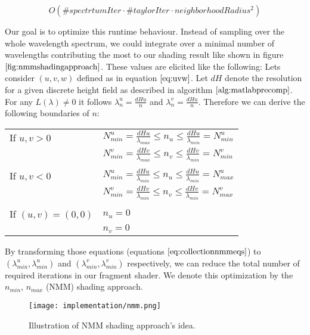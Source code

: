 \begin{equation}
O(\#spectrtumIter \cdot \#taylorIter \cdot neighborhoodRadius^2)
\end{equation}
 
Our goal is to optimize this runtime behaviour. Instead of sampling over the whole wavelength spectrum, we could integrate over a minimal number of  wavelengths contributing the most to our shading result like shown in figure $\ref{fig:nmmshadingapproach}$. These values are elicited like the following: Lets consider $(u,v,w)$ defined as in equation $\ref{eq:uvw}$. Let $dH$ denote the resolution for a given discrete height field as described in algorithm $\ref{alg:matlabprecomp}$. For any $L(\lambda) \neq 0$ it follows $\lambda_{n}^{u} = \frac{dH u}{n}$ and $\lambda_{n}^{v} = \frac{dH u}{n}$. Therefore we can derive the following boundaries of $n$:

\label{eq:collectionnmmeqs}
\begin{table}[H]
  \centering 
  \begin{tabular}{l l}
    If $u,v > 0$ & $N_{min}^{u} = \frac{dH u}{\lambda_{max}} \leq n_{u} \leq \frac{dH u}{\lambda_{min}} = N_{min}^{u}$ \\  
    & $N_{min}^{v} = \frac{dH v}{\lambda_{max}} \leq n_{v} \leq \frac{dH v}{\lambda_{min}} = N_{min}^{v}$ \\
    & \\
    If $u,v < 0$ & $N_{min}^{u} = \frac{dH u}{\lambda_{min}} \leq n_{u} \leq \frac{dH u}{\lambda_{min}} = N_{max}^{u}$ \\
    & $N_{min}^{v} = \frac{dH v}{\lambda_{min}} \leq n_{v} \leq \frac{dH v}{\lambda_{min}} = N_{max}^{v}$ \\
    & \\
    If $(u,v)=(0,0)$ & $n_u = 0$ \\
    & $n_v = 0$ \\  
  \end{tabular} 
\end{table}

By transforming those equations (equations $\ref{eq:collectionnmmeqs}$) to $(\lambda_{min}^{u}, \lambda_{min}^{u})$ and $(\lambda_{min}^{v}, \lambda_{min}^{v})$ respectively, we can reduce the total number of required iterations in our fragment shader. We denote this optimization by the $n_{min}$, $n_{max}$ (NMM) shading approach. 

\begin{figure}[H]
  \centering
  \texttt{[image: implementation/nmm.png]}
  \caption[NMM Shading Approach]{Illustration of NMM shading approach's idea.}
  \label{fig:nmmshadingapproach}
\end{figure}

